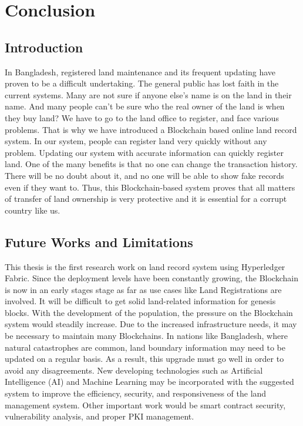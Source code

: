 \documentclass[12pt]{ucthesis}
\begin{document}
\chapter{Conclusion}
\label{Conclusion}

\section{Introduction}
\label{conclusion_into}
    
    In Bangladesh, registered land maintenance and its frequent updating have proven to be a  difficult undertaking. The general public has lost faith in the current systems. Many are not sure if anyone else’s name is on the land in their name. And many people can’t be sure who the real owner of the land is when they buy land? We have to go to the land office to register, and face various problems. That is why we have introduced a Blockchain based online land record system. In our system, people can register land very quickly without any problem. Updating our system with accurate information can quickly register land. One of the many benefits is that no one can change the transaction history. There will be no doubt about it, and no one will be able to show fake records even if they want to. Thus, this Blockchain-based system proves that all matters of transfer of land ownership is very protective and it is essential for a corrupt country like us.

\section{Future Works and Limitations}
\label{conclusion_fwl}

   This thesis is the first research work on land record system using Hyperledger Fabric. Since the deployment levels have been constantly growing, the Blockchain is now in an early stages stage as 
far as use cases like Land Registrations are involved. It will be difficult to get solid land-related information for genesis blocks.
With the development of the population, the pressure on the Blockchain system would steadily increase. Due to the increased infrastructure needs, it may be necessary to maintain many Blockchains. In nations like Bangladesh, where natural catastrophes are common, land boundary information may need to be updated on a regular basis. As a result, this upgrade must go well in order to avoid any disagreements. New developing technologies such as Artificial Intelligence (AI) and Machine Learning may be incorporated with the suggested system to improve the efficiency, security, and responsiveness of the land management system. Other important work would be smart contract security, vulnerability analysis, and proper PKI management. 
\end{document}
